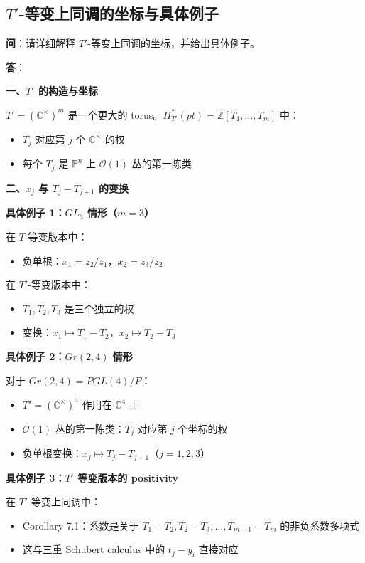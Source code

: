 \subsection{$T'$-等变上同调的坐标与具体例子}\label{sec:qa-Tprime-coordinates-examples}
\textbf{问}：请详细解释 $T'$-等变上同调的坐标，并给出具体例子。

\textbf{答}：

\textbf{一、$T'$ 的构造与坐标}

$T' = (\mathbb{C}^\times)^m$ 是一个更大的 torus。$H_{T'}^*(pt) = \mathbb{Z}[T_1, \ldots, T_m]$ 中：
\begin{itemize}
\item $T_j$ 对应第 $j$ 个 $\mathbb{C}^\times$ 的权
\item 每个 $T_j$ 是 $\mathbb{P}^n$ 上 $\mathcal{O}(1)$ 丛的第一陈类
\end{itemize}

\textbf{二、$x_j$ 与 $T_j - T_{j+1}$ 的变换}

\textbf{具体例子 1：$GL_3$ 情形（$m=3$）}

在 $T$-等变版本中：
\begin{itemize}
\item 负单根：$x_1 = z_2/z_1$，$x_2 = z_3/z_2$
\end{itemize}

在 $T'$-等变版本中：
\begin{itemize}
\item $T_1, T_2, T_3$ 是三个独立的权
\item 变换：$x_1 \mapsto T_1 - T_2$，$x_2 \mapsto T_2 - T_3$
\end{itemize}

\textbf{具体例子 2：$Gr(2,4)$ 情形}

对于 $Gr(2,4) = PGL(4)/P$：
\begin{itemize}
\item $T' = (\mathbb{C}^\times)^4$ 作用在 $\mathbb{C}^4$ 上
\item $\mathcal{O}(1)$ 丛的第一陈类：$T_j$ 对应第 $j$ 个坐标的权
\item 负单根变换：$x_j \mapsto T_j - T_{j+1}$（$j=1,2,3$）
\end{itemize}

\textbf{具体例子 3：$T'$ 等变版本的 positivity}

在 $T'$-等变上同调中：
\begin{itemize}
\item Corollary 7.1：系数是关于 $T_1-T_2, T_2-T_3, \ldots, T_{m-1}-T_m$ 的非负系数多项式
\item 这与三重 Schubert calculus 中的 $t_j - y_i$ 直接对应
\end{itemize}

